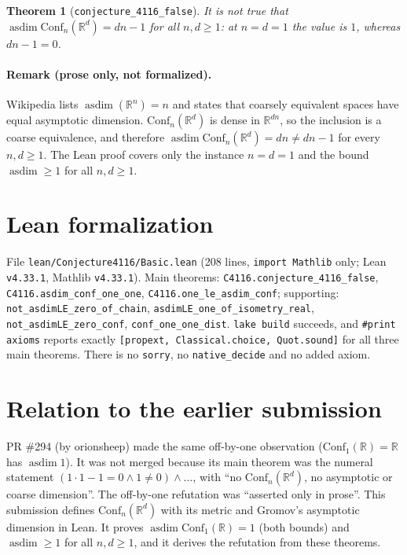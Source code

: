 \documentclass[11pt]{article}
\newtheorem{theorem}{Theorem}
\theoremstyle{definition}
\DeclareMathOperator{\asdim}{asdim}
\begin{document}
\begin{theorem}[\texttt{conjecture\_4116\_false}]
It is not true that $\asdim\mathrm{Conf}_n(\mathbb R^d)=dn-1$ for all $n,d\ge1$: at $n=d=1$ the
value is $1$, whereas $dn-1=0$.
\end{theorem}

\paragraph{Remark (prose only, not formalized).} Wikipedia lists $\asdim(\mathbb R^n)=n$ and states
that coarsely equivalent spaces have equal asymptotic dimension. $\mathrm{Conf}_n(\mathbb R^d)$ is
dense in $\mathbb R^{dn}$, so the inclusion is a coarse equivalence, and therefore
$\asdim\mathrm{Conf}_n(\mathbb R^d)=dn\ne dn-1$ for every $n,d\ge1$. The Lean proof covers only the
instance $n=d=1$ and the bound $\asdim\ge1$ for all $n,d\ge1$.

\section{Lean formalization}
File \texttt{lean/Conjecture4116/Basic.lean} (208 lines, \texttt{import Mathlib} only; Lean
\texttt{v4.33.1}, Mathlib \texttt{v4.33.1}). Main theorems: \texttt{C4116.conjecture\_4116\_false},
\texttt{C4116.asdim\_conf\_one\_one}, \texttt{C4116.one\_le\_asdim\_conf}; supporting:
\texttt{not\_asdimLE\_zero\_of\_chain}, \texttt{asdimLE\_one\_of\_isometry\_real},
\texttt{not\_asdimLE\_zero\_conf}, \texttt{conf\_one\_one\_dist}. \texttt{lake build} succeeds, and
\texttt{\#print axioms} reports exactly \texttt{[propext, Classical.choice, Quot.sound]} for all three
main theorems. There is no \texttt{sorry}, no \texttt{native\_decide} and no added axiom.

\section{Relation to the earlier submission}
PR \#294 (by orionsheep) made the same off-by-one observation ($\mathrm{Conf}_1(\mathbb R)=\mathbb R$
has $\asdim 1$). It was not merged because its main theorem was the numeral statement
$(1\cdot1-1=0\wedge1\ne0)\wedge\dots$, with ``no $\mathrm{Conf}_n(\mathbb R^d)$, no asymptotic or coarse
dimension''. The off-by-one refutation was ``asserted only in prose''. This submission defines
$\mathrm{Conf}_n(\mathbb R^d)$ with its metric and Gromov's asymptotic dimension in Lean. It proves
$\asdim\mathrm{Conf}_1(\mathbb R)=1$ (both bounds) and $\asdim\ge1$ for all $n,d\ge1$, and it derives
the refutation from these theorems.
\end{document}
